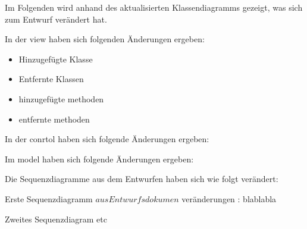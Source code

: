 Im Folgenden wird anhand des aktualisierten Klassendiagramms gezeigt, was sich zum Entwurf verändert hat.


In der view haben sich folgenden Änderungen ergeben:
  \begin{itemize}
      \item Hinzugefügte Klasse
      \item Entfernte Klassen
      \item hinzugefügte methoden
      \item entfernte methoden
  \end{itemize}
  
In der conrtol haben sich folgende Änderungen ergeben:

Im model haben sich folgende Änderungen ergeben:

Die Sequenzdiagramme aus dem Entwurfen haben sich wie folgt verändert:

Erste Sequenzdiagramm \(aus Entwurfsdokumen\) 
 veränderungen : blablabla
 
 Zweites Sequenzdiagram
 etc
